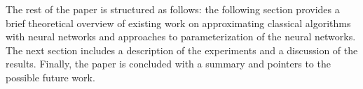 The rest of the paper is structured as follows: the following section provides a brief theoretical overview of existing work on approximating classical algorithms with neural networks and approaches to parameterization of the neural networks. The next section includes a description of the experiments and a discussion of the results. Finally, the paper is concluded with a summary and pointers to the possible future work.







